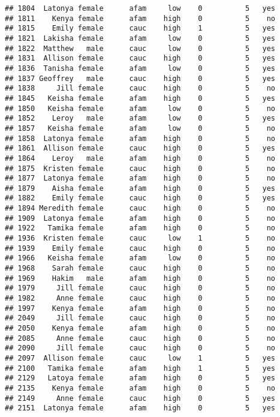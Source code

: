 \documentclass[
]{article}
\begin{document}
\begin{verbatim}
## 1804  Latonya female      afam     low    0          5   yes
## 1811    Kenya female      afam    high    0          5    no
## 1815    Emily female      cauc    high    1          5   yes
## 1821  Lakisha female      afam     low    0          5   yes
## 1822  Matthew   male      cauc     low    0          5   yes
## 1831  Allison female      cauc    high    0          5   yes
## 1836  Tanisha female      afam     low    0          5   yes
## 1837 Geoffrey   male      cauc    high    0          5   yes
## 1838     Jill female      cauc    high    0          5    no
## 1845   Keisha female      afam    high    0          5   yes
## 1850   Keisha female      afam     low    0          5    no
## 1852    Leroy   male      afam     low    0          5   yes
## 1857   Keisha female      afam     low    0          5    no
## 1858  Latonya female      afam    high    0          5    no
## 1861  Allison female      cauc    high    0          5   yes
## 1864    Leroy   male      afam    high    0          5    no
## 1875  Kristen female      cauc    high    0          5    no
## 1877  Latonya female      afam    high    0          5    no
## 1879    Aisha female      afam    high    0          5   yes
## 1882    Emily female      cauc    high    0          5   yes
## 1894 Meredith female      cauc    high    0          5    no
## 1909  Latonya female      afam    high    0          5    no
## 1922   Tamika female      afam    high    0          5    no
## 1936  Kristen female      cauc     low    1          5    no
## 1939    Emily female      cauc    high    0          5    no
## 1966   Keisha female      afam     low    0          5    no
## 1968    Sarah female      cauc    high    0          5    no
## 1969    Hakim   male      afam    high    0          5    no
## 1979     Jill female      cauc    high    0          5    no
## 1982     Anne female      cauc    high    0          5    no
## 1997    Kenya female      afam    high    0          5    no
## 2049     Jill female      cauc    high    0          5    no
## 2050    Kenya female      afam    high    0          5    no
## 2085     Anne female      cauc    high    0          5    no
## 2090     Jill female      cauc    high    0          5    no
## 2097  Allison female      cauc     low    1          5   yes
## 2100   Tamika female      afam    high    1          5   yes
## 2129   Latoya female      afam    high    0          5   yes
## 2135    Kenya female      afam    high    0          5    no
## 2149     Anne female      cauc    high    0          5   yes
## 2151  Latonya female      afam    high    0          5   yes

\end{verbatim}
\end{document}
